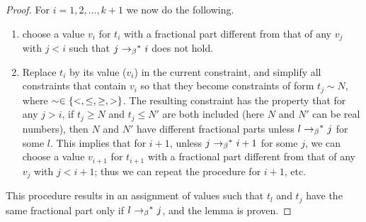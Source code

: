 \begin{proof}
For $i = 1,2,\ldots, k+1$ we  now do the following.
\begin{enumerate}
\item choose a value $v_i$ for $t_i$ with a fractional part different
  from that of any $v_j$ with $j < i$ such that $j \ {\rightarrow_{\beta}}^*\  i$
  does not hold.
\item
Replace $t_i$ by its value ($v_i$) in the current constraint, and
simplify all constraints that contain $v_i$ so that they become 
constraints of form $t_j \sim N$, where $\sim \in \lbrace <,\leq,\geq,>\rbrace$.
The resulting constraint has the property that for any $j > i$,
if $t_j \geq N$ and $t_j \leq N'$ are both included (here $N$ and $N'$ can
be real numbers), then $N$ and $N'$ have different fractional parts unless
$l \ {\rightarrow_{\beta}}^*\  j$ for some $l$. This implies that for $i+1$,
unless $j \ {\rightarrow_{\beta}}^*\  i+1$ for some $j$,
we can choose a value $v_{i+1}$ for $t_{i+1}$ with a fractional part different
  from that of any $v_j$ with $j < i+1$;
 thus we can repeat the procedure for $i+1$, etc.
\end{enumerate}
This procedure results in an assignment of values such that
  $t_l$ and $t_j$ have the same fractional part only if
  $l \ {\rightarrow_{\beta}}^*\  j$, and the lemma is proven.
\end{proof}

